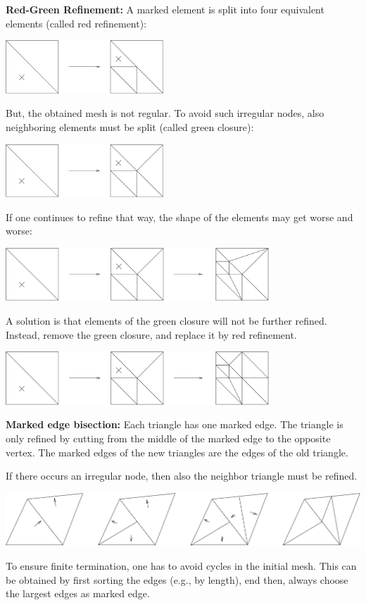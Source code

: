 {\bf Red-Green Refinement: \newline }
A marked element is split into four equivalent elements (called red refinement):
\begin{center}
\includegraphics[height=2cm]{pictures/refine_irreg}
\end{center}
But, the obtained mesh is not regular. To avoid such irregular nodes,
also neighboring elements must be split (called green closure):
\begin{center}
\includegraphics[height=2cm]{pictures/refine_reg}
\end{center}
If one continues to refine that way, the shape of the elements may get worse and worse:
\begin{center}
\includegraphics[height=2cm]{pictures/refinebad}
\end{center}
A solution is that elements of the green closure will not be further refined. 
Instead, remove the green closure, and replace it by red refinement. 
\begin{center}
\includegraphics[height=2cm]{pictures/refinegood}
\end{center}


\bigskip
{\bf Marked edge bisection:} \newline
Each triangle has one marked edge. 
The triangle is only refined by cutting from the middle of the
marked edge to the opposite vertex. The marked edges of the new triangles
are the edges of the old triangle.

If there occurs an irregular node, then also the neighbor triangle must be refined.
\begin{center}
\includegraphics[height=2cm]{pictures/bisect}
\end{center}
To ensure finite termination, one has to avoid cycles in the initial mesh. 
This can be obtained by first sorting the edges (e.g., by length), end then, 
always choose the largest edges as marked edge.


